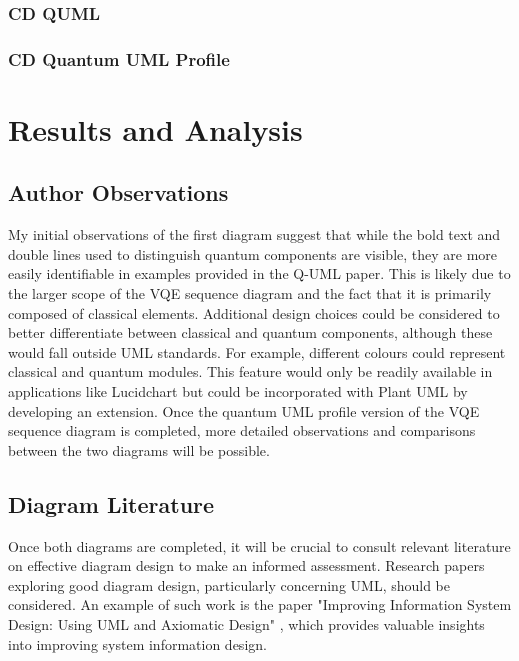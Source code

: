 \documentclass{article}
\begin{document}
{\subsubsection{CD QUML}

\subsubsection{CD Quantum UML Profile}

\section{Results and Analysis}

\subsection{Author Observations}

My initial observations of the first diagram suggest that while the bold text and double lines used to distinguish quantum components are visible, they are more easily identifiable in examples provided in the Q-UML paper. This is likely due to the larger scope of the VQE sequence diagram and the fact that it is primarily composed of classical elements.
Additional design choices could be considered to better differentiate between classical and quantum components, although these would fall outside UML standards. For example, different colours could represent classical and quantum modules. This feature would only be readily available in applications like Lucidchart but could be incorporated with Plant UML by developing an extension.
Once the quantum UML profile version of the VQE sequence diagram is completed, more detailed observations and comparisons between the two diagrams will be possible.

\subsection{Diagram Literature}

Once both diagrams are completed, it will be crucial to consult relevant literature on effective diagram design to make an informed assessment. Research papers exploring good diagram design, particularly concerning UML, should be considered. An example of such work is the paper "Improving Information System Design: Using UML and Axiomatic Design" \cite{CAVIQUE2022103569}, which provides valuable insights into improving system information design.

}
\end{document}
